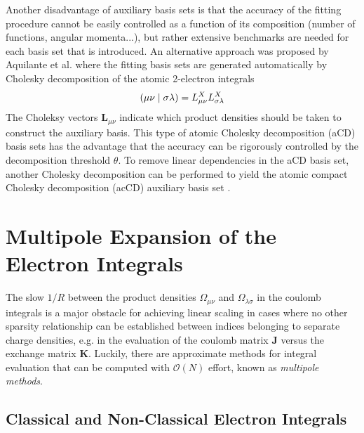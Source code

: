 Another disadvantage of auxiliary basis sets is that the accuracy of the fitting procedure cannot be easily controlled as a function of its composition (number of functions, angular momenta...), but rather extensive benchmarks are needed for each basis set that is introduced. An alternative approach was proposed by Aquilante et al. \cite{Aqu2007} where the fitting basis sets are generated automatically by Cholesky decomposition of the atomic 2-electron integrals
\begin{equation}
\left( \mu\nu \mid \sigma\lambda \right) = L^X_{\mu\nu} L^X_{\sigma\lambda}
\end{equation}
\noindent The Choleksy vectors $\mathbf{L}_{\mu\nu}$ indicate which product densities should be taken to construct the auxiliary basis. This type of atomic Cholesky decomposition (aCD) basis sets has the advantage that the accuracy can be rigorously controlled by the decomposition threshold $\theta$. To remove linear dependencies in the aCD basis set, another Cholesky decomposition can be performed to yield the atomic compact Cholesky decomposition (acCD) auxiliary basis set \cite{Aqu2009}.


\section{Multipole Expansion of the Electron Integrals}

The slow $1/R$ between the product densities $\Omega_{\mu\nu}$ and $\Omega_{\lambda\sigma}$ in the coulomb integrals is a major obstacle for achieving linear scaling in cases where no other sparsity relationship can be established between indices belonging to separate charge densities, e.g. in the evaluation of the coulomb matrix $\mathbf{J}$ versus the exchange matrix $\mathbf{K}$. Luckily, there are approximate methods for integral evaluation that can be computed with $\mathcal{O}(N)$ effort, known as \emph{multipole methods}.

\subsection{Classical and Non-Classical Electron Integrals}

